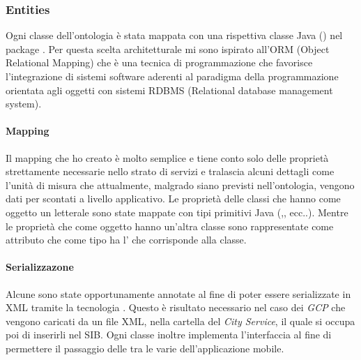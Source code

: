 

\subsubsection{Entities}

Ogni classe dell'ontologia è stata mappata con una rispettiva classe Java () nel package  . Per questa scelta architetturale mi sono ispirato all'ORM (Object Relational Mapping) che è una tecnica di programmazione che favorisce l'integrazione di sistemi software aderenti al paradigma della programmazione orientata agli oggetti con sistemi RDBMS (Relational database management system). %

\paragraph{Mapping} Il mapping che ho creato è molto semplice e tiene conto solo delle proprietà strettamente necessarie nello strato di servizi e tralascia alcuni dettagli come l'unità di misura che attualmente, malgrado siano previsti nell'ontologia, vengono dati per scontati a livello applicativo.
Le proprietà delle classi che hanno come oggetto un letterale sono state mappate con tipi primitivi Java (,, ecc..). Mentre le proprietà che come oggetto hanno un'altra classe sono rappresentate come attributo che come tipo ha l'
che corrisponde alla classe. 

\paragraph{Serializzazone} Alcune  sono state opportunamente annotate al fine di poter essere serializzate in XML tramite la tecnologia . Questo è risultato necessario nel caso dei \emph{GCP} che vengono caricati da un file XML, nella cartella del \emph{City Service}, il quale si occupa poi di inserirli nel SIB. Ogni classe inoltre implementa l'interfaccia  al fine di permettere il passaggio delle  tra le varie  dell'applicazione mobile.

